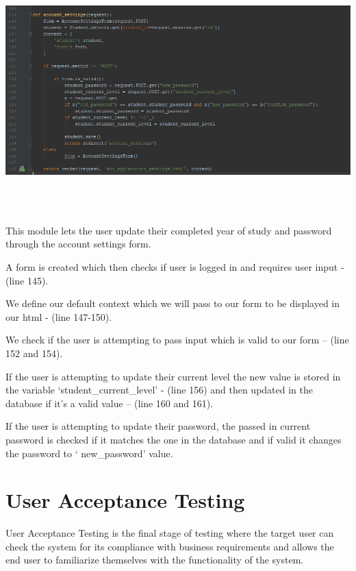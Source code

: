 \documentclass[10pt]{article}
\begin{document}
\begin{center}
\includegraphics[width=1.1\textwidth]{p14.png}
\end{center} \\ \\

\begin{description}[font=$\bullet$~\normalfont\scshape\color{red!50!black}]
\item [] This module lets the user update their completed year of study and password through the account settings form.
\item [] A form is created which then checks if user is logged in and requires user input - (line 145).
\item [] We define our default context which we will pass to our form to be displayed in our html - (line 147-150).
\item [] We check if the user is attempting to pass input which is valid to our form – (line 152 and 154).
\item [] If the user is attempting to update their current level the new value is stored in the variable ‘student\_current\_level’ - (line 156) and then updated in the database if it’s a valid value – (line 160 and 161). 
\item [] If the user is attempting to update their password, the passed in current password is checked if it matches the one in the database and if valid it changes the password to ‘ new\_password’ value.

\end{description}

\section{User Acceptance Testing}

User Acceptance Testing is the final stage of testing where the target user can check the system for its compliance with business requirements and allows the end user to familiarize themselves with the functionality of the system.
\end{document}
